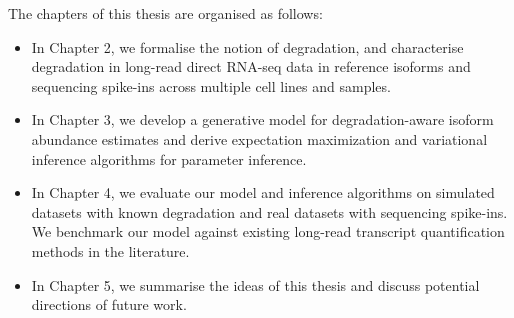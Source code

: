 The chapters of this thesis are organised as follows:
\begin{itemize}
    \item In Chapter 2, we formalise the notion of degradation, and characterise degradation in long-read direct RNA-seq data in reference isoforms and sequencing spike-ins across multiple cell lines and samples. 
    \item In Chapter 3, we develop a generative model for degradation-aware isoform abundance estimates and derive expectation maximization and variational inference algorithms for parameter inference. 
    \item In Chapter 4, we evaluate our model and inference algorithms on simulated datasets with known degradation and real datasets with sequencing spike-ins. We benchmark our model against existing long-read transcript quantification methods in the literature. 
    \item In Chapter 5, we summarise the ideas of this thesis and discuss potential directions of future work. 
\end{itemize}